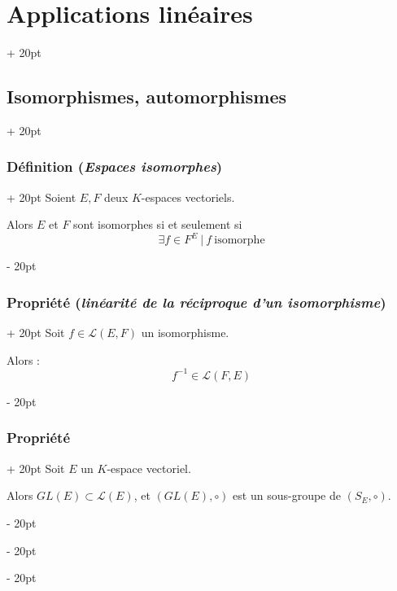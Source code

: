 \documentclass[a4paper, 12pt, twoside]{article}
\newcommand{\ind}[1][20pt]{\advance\leftskip + #1}
\newcommand{\deind}[1][20pt]{\advance\leftskip - #1}
\newenvironment{indt}[2][20pt]{#2 \par \ind[#1]}{\par \deind} %
\begin{document}
\begin{indt}{\section{Applications linéaires}}
\begin{indt}{\subsection{Isomorphismes, automorphismes}}
            \begin{indt}{\subsubsection{Définition (\textit{Espaces isomorphes})}}
                Soient $E, F$ deux $K$-espaces vectoriels.

                Alors $E$ et $F$ sont isomorphes si et seulement si
                \[
                    \exists f \in F^E\ |\ f\ \text{isomorphe}
                \]
            \end{indt}

            \vspace{12pt}
            
            \begin{indt}{\subsubsection{Propriété (\textit{linéarité de la réciproque d'un isomorphisme})}}
                Soit $f \in \mathcal L(E, F)$ un isomorphisme.

                Alors :
                \[
                    f^{-1} \in \mathcal L(F, E)
                \]
            \end{indt}

            \vspace{12pt}
            
            \begin{indt}{\subsubsection{Propriété}}
                Soit $E$ un $K$-espace vectoriel.

                Alors $GL(E) \subset \mathcal L(E)$, et $(GL(E), \circ)$ est un sous-groupe de $(S_E, \circ)$.
            \end{indt}
        \end{indt}
        
    \end{indt}

    \vspace{12pt}
    
\end{document}
